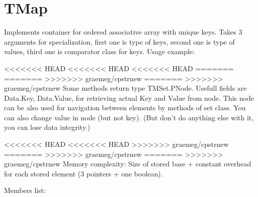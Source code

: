 \chapter{TMap}

Implements container for ordered associative array with unique keys.
Takes 3 arguments for specialization, first one is type of keys, second one is type of values, third
one is comparator class for keys.
Usage example:



<<<<<<< HEAD
<<<<<<< HEAD
<<<<<<< HEAD
=======
=======
>>>>>>> graemeg/cpstrnew
=======
>>>>>>> graemeg/cpstrnew
Some methods return type TMSet.PNode. Usefull fields are Data.Key, Data.Value, for retrieving
actual Key and Value from node. This node can be also used for navigation between elements by methods of set class.
You can also change value in node (but not key).
(But don't do anything else with it, you can lose data integrity.)

<<<<<<< HEAD
<<<<<<< HEAD
>>>>>>> graemeg/cpstrnew
=======
>>>>>>> graemeg/cpstrnew
=======
>>>>>>> graemeg/cpstrnew
Memory complexity:
Size of stored base + constant overhead for each stored element (3 pointers + one boolean).

Members list:

